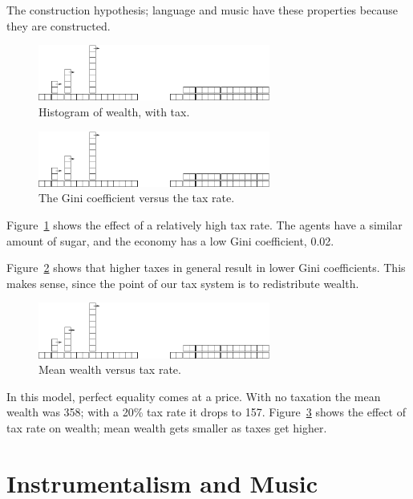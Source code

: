 \documentclass[10pt]{book}
\begin{document}
The construction hypothesis; language and music have these properties because they are constructed.

\begin{figure}[ht]
\centerline{\includegraphics[width=3.0in]{figs/towers}}
\caption{Histogram of wealth, with tax.\label{fig.withtax}}
\end{figure}

\begin{figure}[ht]
\centerline{\includegraphics[width=3.0in]{figs/towers}}
\caption{The Gini coefficient versus the tax rate.\label{fig.gini}}
\end{figure}

Figure~\ref{fig.withtax} shows the effect of a relatively high tax
rate. The agents have a similar amount of sugar, and the economy has a
low Gini coefficient, 0.02.

Figure~\ref{fig.gini} shows that
higher taxes in general result in lower Gini coefficients. This makes
sense, since the point of our tax system is to redistribute
wealth.

\begin{figure}[ht]
\centerline{\includegraphics[width=3.0in]{figs/towers}}
\caption{Mean wealth versus tax rate.\label{fig.wealth}}
\end{figure}

In this model, perfect equality comes at a price.  With no taxation
the mean wealth was 358; with a 20\% tax rate it drops to 157.
Figure~\ref{fig.wealth} shows the effect of tax rate on wealth;
mean wealth gets smaller as taxes get higher.



\section{Instrumentalism and Music}
\end{document}
